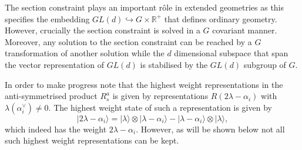 The section constraint plays an important rôle in extended geometries as this specifies the embedding $GL(d)\hookrightarrow G\times\mathbb{R}^+$ that defines ordinary geometry. However, crucially the section constraint is solved in a $G$ covariant manner. Moreover, any solution to the section constraint can be reached by a $G$ transformation of another solution while the $d$ dimensional subspace that span the vector representation of $GL(d)$ is stabilised by the $GL(d)$ subgroup of $G$.

In order to make progress note that the highest weight representations in the anti-symmetrised product $R_s^a$ is given by representations $R(2\lambda-\alpha_i)$ with $\lambda(\alpha^\vee_i)\neq 0$. The highest weight state of such a representation is given by
\begin{equation}
    |2\lambda-\alpha_i\rangle = |\lambda\rangle \otimes |\lambda-\alpha_i\rangle - |\lambda-\alpha_i\rangle \otimes |\lambda\rangle,
\end{equation}
which indeed has the weight $2\lambda-\alpha_i$. However, as will be shown below not all such highest weight representations can be kept.

